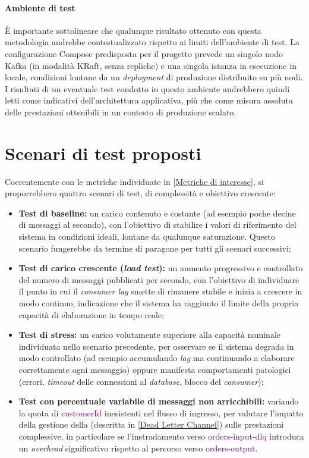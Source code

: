 \paragraph{Ambiente di test} È importante sottolineare che qualunque risultato ottenuto con questa metodologia andrebbe contestualizzato rispetto ai limiti dell'ambiente di test. 
La configurazione  Compose predisposta per il progetto prevede un singolo nodo Kafka (in modalità KRaft, senza repliche) e una singola istanza  in esecuzione in locale, condizioni lontane da un \textit{deployment} di produzione distribuito su più nodi. 
I risultati di un eventuale test condotto in questo ambiente andrebbero quindi letti come indicativi dell'architettura applicativa, più che come misura assoluta delle prestazioni ottenibili in un contesto di produzione scalato.

\section{Scenari di test proposti}
\label{Scenari di test proposti}
Coerentemente con le metriche individuate in \ref{Metriche di interesse}, si proporrebbero quattro scenari di test, di complessità e obiettivo crescente:
\begin{itemize}
    \item \textbf{Test di baseline:} un carico contenuto e costante (ad esempio poche decine di messaggi al secondo), con l'obiettivo di stabilire i valori di riferimento del sistema in condizioni ideali, lontane da qualunque saturazione. Questo scenario fungerebbe da termine di paragone per tutti gli scenari successivi;
    \item \textbf{Test di carico crescente (\textit{load test}):} un aumento progressivo e controllato del numero di messaggi pubblicati per secondo, con l'obiettivo di individuare il punto in cui il \textit{consumer lag} smette di rimanere stabile e inizia a crescere in modo continuo, indicazione che il sistema ha raggiunto il limite della propria capacità di elaborazione in tempo reale;
    \item \textbf{Test di stress:} un carico volutamente superiore alla capacità nominale individuata nello scenario precedente, per osservare se il sistema degrada in modo controllato (ad esempio accumulando \textit{lag} ma continuando a elaborare correttamente ogni messaggio) oppure manifesta comportamenti patologici (errori, \textit{timeout} delle connessioni al \textit{database}, blocco del \textit{consumer});
    \item \textbf{Test con percentuale variabile di messaggi non arricchibili:} variando la quota di \textcolor{purple}{customerId} inesistenti nel flusso di ingresso, per valutare l'impatto della gestione della  (descritta in \ref{Dead Letter Channel}) sulle prestazioni complessive, in particolare se l'instradamento verso \textcolor{purple}{orders-input-dlq} introduca un \textit{overhead} significativo rispetto al percorso verso \textcolor{purple}{orders-output}.
\end{itemize}


